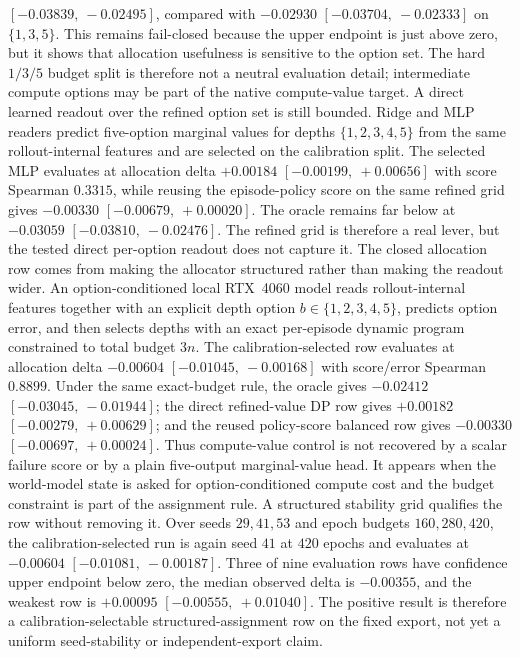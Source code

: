 $[-0.03839,\ -0.02495]$, compared with $-0.02930$
$[-0.03704,\ -0.02333]$ on $\{1,3,5\}$.  This remains fail-closed because the
upper endpoint is just above zero, but it shows that allocation usefulness is
sensitive to the option set.  The hard $1/3/5$ budget split is therefore not a
neutral evaluation detail; intermediate compute options may be part of the
native compute-value target.
A direct learned readout over the refined option set is still bounded.  Ridge
and MLP readers predict five-option marginal values for depths
$\{1,2,3,4,5\}$ from the same rollout-internal features and are selected on the
calibration split.  The selected MLP evaluates at allocation delta $+0.00184$
$[-0.00199,\ +0.00656]$ with score Spearman $0.3315$, while reusing the
episode-policy score on the same refined grid gives $-0.00330$
$[-0.00679,\ +0.00020]$.  The oracle remains far below at $-0.03059$
$[-0.03810,\ -0.02476]$.  The refined grid is therefore a real lever, but the
tested direct per-option readout does not capture it.
The closed allocation row comes from making the allocator structured rather
than making the readout wider.  An option-conditioned local RTX~4060 model
reads rollout-internal features together with an explicit depth option
$b\in\{1,2,3,4,5\}$, predicts option error, and then selects depths with an
exact per-episode dynamic program constrained to total budget $3n$.  The
calibration-selected row evaluates at allocation delta $-0.00604$
$[-0.01045,\ -0.00168]$ with score/error Spearman $0.8899$.  Under the same
exact-budget rule, the oracle gives $-0.02412$ $[-0.03045,\ -0.01944]$; the
direct refined-value DP row gives $+0.00182$ $[-0.00279,\ +0.00629]$; and the
reused policy-score balanced row gives $-0.00330$ $[-0.00697,\ +0.00024]$.
Thus compute-value control is not recovered by a scalar failure score or by a
plain five-output marginal-value head.  It appears when the world-model state is
asked for option-conditioned compute cost and the budget constraint is part of
the assignment rule.
A structured stability grid qualifies the row without removing it.  Over seeds
$29,41,53$ and epoch budgets $160,280,420$, the calibration-selected run is
again seed $41$ at $420$ epochs and evaluates at $-0.00604$
$[-0.01081,\ -0.00187]$.  Three of nine evaluation rows have confidence upper
endpoint below zero, the median observed delta is $-0.00355$, and the weakest
row is $+0.00095$ $[-0.00555,\ +0.01040]$.  The positive result is therefore a
calibration-selectable structured-assignment row on the fixed export, not yet a
uniform seed-stability or independent-export claim.
